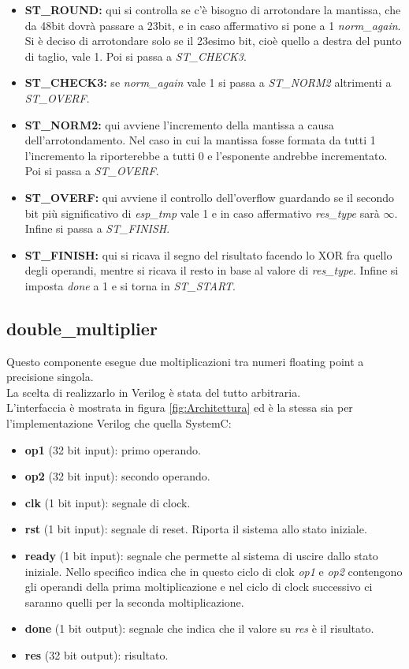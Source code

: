 \documentclass[]{IEEEtran}
\begin{document}
\begin{itemize}
    \item \textbf{ST\_ROUND:} qui si controlla se c'è bisogno di arrotondare la mantissa, che da 48bit dovrà passare a 23bit, e in caso affermativo si pone a 1 \textit{norm\_again}. Si è deciso di arrotondare solo se il 23esimo bit, cioè quello a destra del punto di taglio, vale 1. Poi si passa a \textit{ST\_CHECK3}.
    \item \textbf{ST\_CHECK3:} se \textit{norm\_again} vale 1 si passa a \textit{ST\_NORM2} altrimenti a \textit{ST\_OVERF}. 
    \item \textbf{ST\_NORM2:} qui avviene l'incremento della mantissa a causa dell'arrotondamento. Nel caso in cui la mantissa fosse formata da tutti 1 l'incremento la riporterebbe a tutti 0 e l'esponente andrebbe incrementato. Poi si passa a \textit{ST\_OVERF}.
    \item \textbf{ST\_OVERF:} qui avviene il controllo dell'overflow guardando se il secondo bit più significativo di \textit{esp\_tmp} vale 1 e in caso affermativo \textit{res\_type} sarà $\infty$. Infine si passa a \textit{ST\_FINISH}.
    \item \textbf{ST\_FINISH:} qui si ricava il segno del risultato facendo lo XOR fra quello degli operandi, mentre si ricava il resto in base al valore di \textit{res\_type}. Infine si imposta \textit{done} a 1 e si torna in \textit{ST\_START}.
\end{itemize}


\subsection{double\_multiplier}
Questo componente esegue due moltiplicazioni tra numeri floating point a precisione singola.
\\La scelta di realizzarlo in Verilog è stata del tutto arbitraria.
\\L'interfaccia è mostrata in figura \ref{fig:Architettura} ed è la stessa sia per l'implementazione Verilog che quella SystemC:
\begin{itemize}
    \item \textbf{op1} (32 bit input): primo operando.
    \item \textbf{op2} (32 bit input): secondo operando.
    \item \textbf{clk} (1 bit input): segnale di clock.
    \item \textbf{rst} (1 bit input): segnale di reset. Riporta il sistema allo stato iniziale.
    \item \textbf{ready} (1 bit input): segnale che permette al sistema di uscire dallo stato iniziale. Nello specifico indica che in questo ciclo di clok \textit{op1} e \textit{op2} contengono gli operandi della prima moltiplicazione e nel ciclo di clock successivo ci saranno quelli per la seconda moltiplicazione.
    \item \textbf{done} (1 bit output): segnale che indica che il valore su \textit{res} è il risultato.
    \item \textbf{res} (32 bit output): risultato.
\end{itemize}
    
\end{document}
